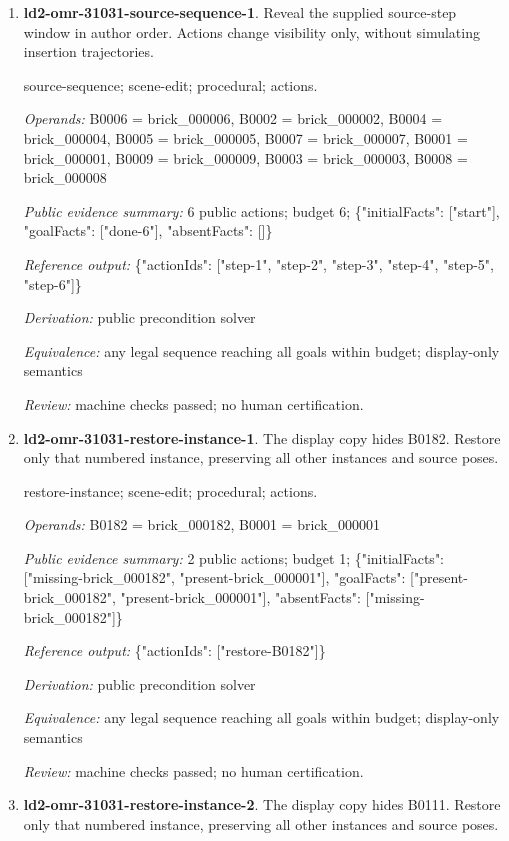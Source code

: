 \begin{enumerate}
\item \textbf{ld2-omr-31031-source-sequence-1}. Reveal the supplied source-step window in author order. Actions change visibility only, without simulating insertion trajectories.
\par{\small source-sequence; scene-edit; procedural; actions.\par\textit{Operands:} B0006 = brick\_000006, B0002 = brick\_000002, B0004 = brick\_000004, B0005 = brick\_000005, B0007 = brick\_000007, B0001 = brick\_000001, B0009 = brick\_000009, B0003 = brick\_000003, B0008 = brick\_000008\par\textit{Public evidence summary:} 6 public actions; budget 6; \{"initialFacts": ["start"], "goalFacts": ["done-6"], "absentFacts": []\}\par\textit{Reference output:} \{"actionIds": ["step-1", "step-2", "step-3", "step-4", "step-5", "step-6"]\}\par\textit{Derivation:} public precondition solver\par\textit{Equivalence:} any legal sequence reaching all goals within budget; display-only semantics\par\textit{Review:} machine checks passed; no human certification.}
\item \textbf{ld2-omr-31031-restore-instance-1}. The display copy hides B0182. Restore only that numbered instance, preserving all other instances and source poses.
\par{\small restore-instance; scene-edit; procedural; actions.\par\textit{Operands:} B0182 = brick\_000182, B0001 = brick\_000001\par\textit{Public evidence summary:} 2 public actions; budget 1; \{"initialFacts": ["missing-brick\_000182", "present-brick\_000001"], "goalFacts": ["present-brick\_000182", "present-brick\_000001"], "absentFacts": ["missing-brick\_000182"]\}\par\textit{Reference output:} \{"actionIds": ["restore-B0182"]\}\par\textit{Derivation:} public precondition solver\par\textit{Equivalence:} any legal sequence reaching all goals within budget; display-only semantics\par\textit{Review:} machine checks passed; no human certification.}
\item \textbf{ld2-omr-31031-restore-instance-2}. The display copy hides B0111. Restore only that numbered instance, preserving all other instances and source poses.

\end{enumerate}
